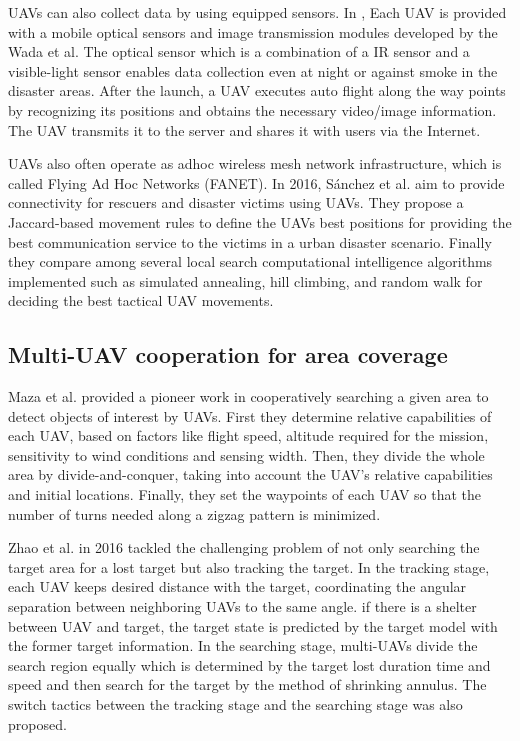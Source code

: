 \documentclass{ieeeaccess}
\begin{document}
UAVs can also collect data by using equipped sensors. In \cite{Wada2015}, Each UAV is provided with a mobile optical sensors and image transmission modules developed by the Wada et al. The optical sensor which is a combination of a IR sensor and a visible-light sensor enables data collection even at night or against smoke in the disaster areas.
After the launch, a UAV executes auto flight along the way points by recognizing its positions and  obtains the necessary video/image information. The UAV transmits it to the server and shares it with users via the Internet.

UAVs also often operate as adhoc wireless mesh network infrastructure, which is called Flying Ad Hoc Networks (FANET)\cite{Bekmezci2013}.
In 2016, S\'anchez et al. aim to provide connectivity for rescuers and disaster victims using UAVs\cite{Garcia2016}.
They propose a Jaccard-based movement rules to define the UAVs best positions for providing the best communication service to the victims in a urban disaster scenario.
Finally they compare among several local search computational intelligence algorithms implemented such as simulated annealing, hill climbing, and random walk for deciding the best tactical UAV movements.

\subsection{Multi-UAV cooperation for area coverage}\label{cover}
Maza et al. provided a pioneer work in cooperatively searching a given area to detect objects of interest by UAVs\cite{Maza2007}.
First they determine relative capabilities of each UAV, based on factors like flight speed, altitude required for the mission, sensitivity to wind conditions and sensing width.
Then, they divide the whole area by divide-and-conquer, taking into account the UAV’s relative capabilities and initial locations.
Finally, they set the waypoints of each UAV so that the number of turns needed along a zigzag pattern is minimized.

Zhao et al. in 2016 tackled the challenging problem of not only searching the target area for a lost target but also tracking the target\cite{chang2016}.
In the tracking stage, each UAV keeps desired distance with the target, coordinating the angular separation between neighboring UAVs to the same angle.
if there is a shelter between UAV and target, the target state is predicted by the target model with the former target information.  
In the searching stage, multi-UAVs divide the search region equally which is determined by the target lost duration time and speed and then search for the target by the method of shrinking annulus.
The switch tactics between the tracking stage and the searching stage was also proposed. 
\end{document}
